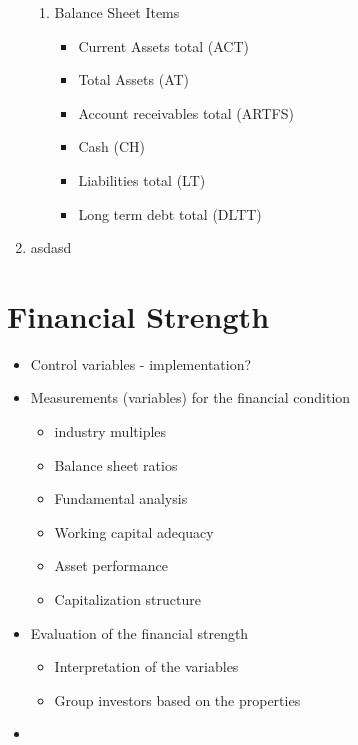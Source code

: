 \documentclass[12pt]{article}
\begin{document}
\begin{enumerate}
\begin{enumerate}
        \item Balance Sheet Items 
        \begin{itemize}
            \item Current Assets total (ACT)
            \item Total Assets (AT)
            \item Account receivables total (ARTFS)
            \item Cash (CH)
            \item Liabilities total (LT) 
            \item Long term debt total (DLTT)
        \end{itemize}
        
    \end{enumerate}
    
    \item asdasd

\end{enumerate}


\section{Financial Strength}

    \begin{itemize}
    \item Control variables - implementation?

    \item Measurements (variables) for the financial condition 

        \begin{itemize}
        \item industry multiples
        \item Balance sheet ratios 
        \item Fundamental analysis
        \item Working capital adequacy
        \item Asset performance
        \item Capitalization structure
        \end{itemize}

    \item Evaluation of the financial strength

        \begin{itemize}
        \item Interpretation of the variables
        \item Group investors based on the properties
        \end{itemize}

    \item 
    \end{itemize}
\end{document}
